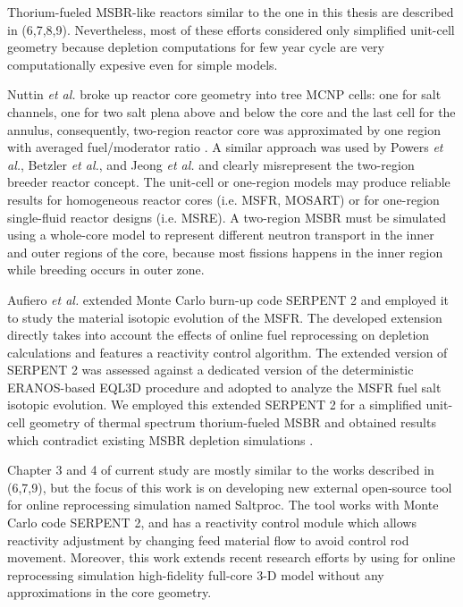 Thorium-fueled \gls{MSBR}-like reactors similar to the one in this thesis are described in (6,7,8,9). Nevertheless, most of these efforts considered only simplified unit-cell geometry because depletion computations for few year cycle are very computationally expesive even for simple models. 

Nuttin \emph{et al.} broke up reactor core geometry into tree \gls{MCNP} cells: one for salt channels, one for two salt plena above and below the core and the last cell for the annulus, consequently, two-region reactor core was approximated by one region with averaged fuel/moderator ratio \cite{nuttin_potential_2005}.  A similar approach was used by Powers \emph{et al.}, Betzler \emph{et al.}, and Jeong \emph{et al.} \cite{powers_new_2013,powers_inventory_2014,betzler_modeling_2016, betzler_molten_2017, jeong_development_2014, jeong_equilibrium_2016} and clearly misrepresent the two-region breeder reactor concept. The unit-cell or one-region models may produce reliable results for homogeneous reactor cores (i.e. \gls{MSFR}, \gls{MOSART}) or for one-region single-fluid reactor designs (i.e. \gls{MSRE}). A two-region \gls{MSBR} must be simulated using a whole-core model to represent different neutron transport in the inner and outer regions of the core, because most fissions happens in the inner region while breeding occurs in outer zone.  

Aufiero \emph{et al.} extended Monte Carlo burn-up code SERPENT 2 and employed it to study the material isotopic evolution of the \gls{MSFR}. The developed extension directly takes into account the effects of online fuel reprocessing on depletion calculations and features a reactivity control algorithm. The extended version of SERPENT 2 was assessed against a dedicated version of the deterministic ERANOS-based EQL3D procedure \cite{ruggieri_eranos_2006} and adopted to analyze the \gls{MSFR} fuel salt isotopic evolution. We employed this extended SERPENT 2 for a simplified unit-cell geometry of thermal spectrum thorium-fueled \gls{MSBR} and obtained results which contradict existing \gls{MSBR} depletion simulations \cite{jeong_equilibrium_2016}.

Chapter 3 and 4 of current study are mostly similar to the works described in (6,7,9), but the focus of this work is on developing new external open-source tool for online reprocessing simulation named Saltproc. The tool works with Monte Carlo code SERPENT 2, and has a reactivity control module which allows reactivity adjustment by changing feed material flow to avoid control rod movement. Moreover, this work extends recent research efforts by using for online reprocessing simulation high-fidelity full-core 3-D model without any approximations in the core geometry.


